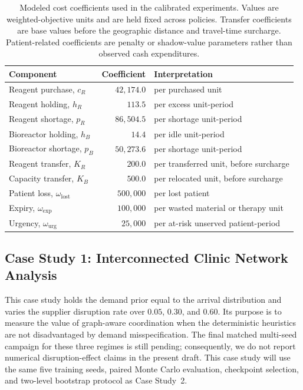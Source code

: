 \documentclass[preprint,review,12pt]{elsarticle}
\begin{document}
\begin{table}[ht]
\centering
\caption{Modeled cost coefficients used in the calibrated experiments. Values are weighted-objective units and are held fixed across policies. Transfer coefficients are base values before the geographic distance and travel-time surcharge. Patient-related coefficients are penalty or shadow-value parameters rather than observed cash expenditures.}
\label{tab:cost_coefficients}
\begin{tabular}{lrl}
\hline
Component & Coefficient & Interpretation \\
\hline
Reagent purchase, $c_R$ & $42{,}174.0$ & per purchased unit \\
Reagent holding, $h_R$ & $113.5$ & per excess unit-period \\
Reagent shortage, $p_R$ & $86{,}504.5$ & per shortage unit-period \\
Bioreactor holding, $h_B$ & $14.4$ & per idle unit-period \\
Bioreactor shortage, $p_B$ & $50{,}273.6$ & per shortage unit-period \\
Reagent transfer, $K_R$ & $200.0$ & per transferred unit, before surcharge \\
Capacity transfer, $K_B$ & $500.0$ & per relocated unit, before surcharge \\
Patient loss, $\omega_{\mathrm{lost}}$ & $500{,}000$ & per lost patient \\
Expiry, $\omega_{\mathrm{exp}}$ & $100{,}000$ & per wasted material or therapy unit \\
Urgency, $\omega_{\mathrm{urg}}$ & $25{,}000$ & per at-risk unserved patient-period \\
\hline
\end{tabular}
\end{table}

\subsection{Case Study 1: Interconnected Clinic Network Analysis}
\label{subsec:casestudy1}
This case study holds the demand prior equal to the arrival distribution and
varies the supplier disruption rate over $0.05$, $0.30$, and $0.60$. Its purpose
is to measure the value of graph-aware coordination when the deterministic
heuristics are not disadvantaged by demand misspecification. The final matched
multi-seed campaign for these three regimes is still pending; consequently, we
do not report numerical disruption-effect claims in the present draft. This
case study will use the same five training seeds, paired Monte Carlo evaluation,
checkpoint selection, and two-level bootstrap protocol as Case Study~2.
\end{document}
